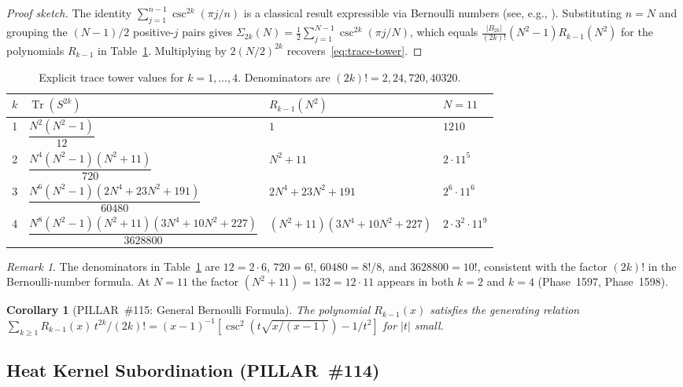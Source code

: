 \documentclass[aps,prd,twocolumn,superscriptaddress,floatfix,nofootinbib]{revtex4-2}
\newtheorem{corollary}[theorem]{Corollary}
\theoremstyle{definition}
\theoremstyle{remark}
\newtheorem{remark}[theorem]{Remark}
\begin{document}
\begin{proof}[Proof sketch]
The identity $\sum_{j=1}^{n-1}\csc^{2k}(\pi j/n)$
is a classical result expressible via Bernoulli numbers
(see, e.g., \cite{apostol1976}).
Substituting $n = N$ and grouping the $(N-1)/2$ positive-$j$ pairs gives
$\Sigma_{2k}(N) = \tfrac{1}{2}\sum_{j=1}^{N-1}\csc^{2k}(\pi j/N)$,
which equals $\tfrac{|B_{2k}|}{(2k)!}(N^2-1)R_{k-1}(N^2)$
for the polynomials $R_{k-1}$ in Table~\ref{tab:trace-tower}.
Multiplying by $2(N/2)^{2k}$ recovers~\eqref{eq:trace-tower}.
\end{proof}

\begin{table}[h]
\centering
\caption{Explicit trace tower values for $k=1,\ldots,4$.
Denominators are $(2k)!=2,24,720,40320$.}
\label{tab:trace-tower}
\begin{tabular}{clll}
\toprule
$k$ & $\operatorname{Tr}(S^{2k})$ & $R_{k-1}(N^2)$ & $N{=}11$ \\
\midrule
1 & $\dfrac{N^2(N^2-1)}{12}$ & $1$ & $1210$ \\[6pt]
2 & $\dfrac{N^4(N^2-1)(N^2+11)}{720}$ & $N^2+11$ & $2\cdot 11^5$ \\[6pt]
3 & $\dfrac{N^6(N^2-1)(2N^4+23N^2+191)}{60480}$ & $2N^4+23N^2+191$ & $2^6\cdot 11^6$ \\[6pt]
4 & $\dfrac{N^8(N^2-1)(N^2+11)(3N^4+10N^2+227)}{3628800}$ & $(N^2+11)(3N^4+10N^2+227)$ & $2\cdot 3^2\cdot 11^9$ \\
\bottomrule
\end{tabular}
\end{table}

\begin{remark}
The denominators in Table~\ref{tab:trace-tower} are $12 = 2\cdot 6$,
$720 = 6!$, $60480 = 8!/\!8$, and $3628800 = 10!$, consistent with the
factor $(2k)!$ in the Bernoulli-number formula.
At $N=11$ the factor $(N^2+11) = 132 = 12\cdot 11$ appears in both
$k=2$ and $k=4$ (Phase~1597, Phase~1598).
\end{remark}

\begin{corollary}[PILLAR~\#115: General Bernoulli Formula]
\label{cor:pillar115}
The polynomial $R_{k-1}(x)$ satisfies the generating relation
$\sum_{k\ge1} R_{k-1}(x)\,t^{2k}/(2k)! = (x-1)^{-1}[\csc^2(t\sqrt{x/(x-1)})-1/t^2]$
for $|t|$ small.
\end{corollary}

\subsection{Heat Kernel Subordination (PILLAR~\#114)}
\label{sec:heat-subordination}
\end{document}
